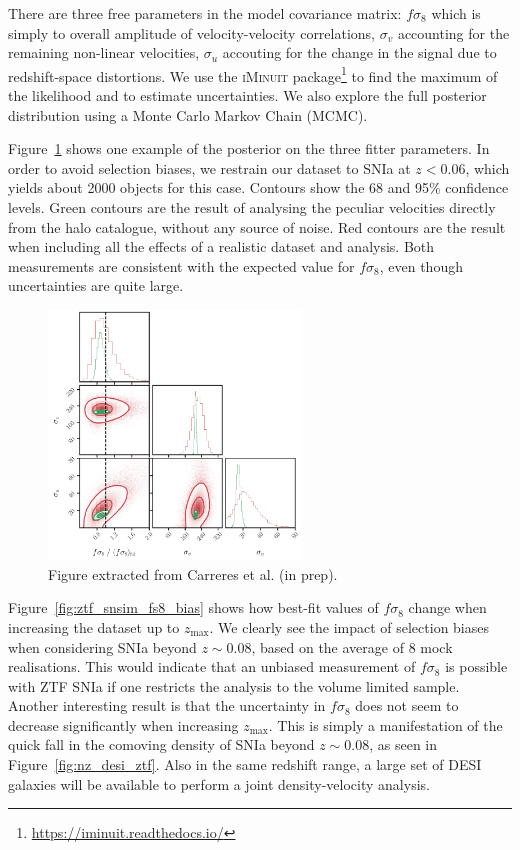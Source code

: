 There are three free parameters in the model covariance matrix: $f\sigma_8$ which is simply to overall 
amplitude of velocity-velocity correlations, $\sigma_v$ accounting for the remaining non-linear 
velocities, $\sigma_u$ accouting for the change in the signal due to redshift-space distortions. 
We use the \textsc{iMinuit} package\footnote{\url{https://iminuit.readthedocs.io/}} to find the maximum 
of the likelihood and to estimate uncertainties. We also explore the full posterior distribution 
using a Monte Carlo Markov Chain (MCMC). 

Figure~\ref{fig:ztf_snsim_posterior} shows one example of the posterior on the three fitter parameters. 
In order to avoid selection biases, we restrain our dataset to SNIa at $z<0.06$, 
which yields about 2000 objects for this case.
Contours show the 68 and 95\% confidence levels. Green contours are the result of analysing the 
peculiar velocities directly from the halo catalogue, without any source of noise. Red contours 
are the result when including all the effects of a realistic dataset and analysis. 
Both measurements are consistent with the expected value for $f\sigma_8$, even though uncertainties 
are quite large.

\begin{figure}
    \centering
    \includegraphics[width=0.6\textwidth]{fig/velocities/bastien_posterior_fs8.png}
    \caption{ Figure extracted from Carreres et al. (in prep).}
    \label{fig:ztf_snsim_posterior}
\end{figure}

Figure~\ref{fig:ztf_snsim_fs8_bias} shows how best-fit values of $f\sigma_8$ change when 
increasing the dataset up to $z_\text{max}$. We clearly see the impact of selection biases 
when considering SNIa beyond $z\sim 0.08$, based on the average of 8 mock realisations. 
This would indicate that an unbiased measurement of $f\sigma_8$ is possible with ZTF SNIa
if one restricts the analysis to the volume limited sample. 
Another interesting result is that the uncertainty in $f\sigma_8$ does not seem to 
decrease significantly when increasing $z_\text{max}$. This is simply a manifestation 
of the quick fall in the comoving density of SNIa beyond $z\sim0.08$, as seen in 
Figure~\ref{fig:nz_desi_ztf}. 
Also in the same redshift range, a large set of DESI galaxies will be available to 
perform a joint density-velocity analysis. 

